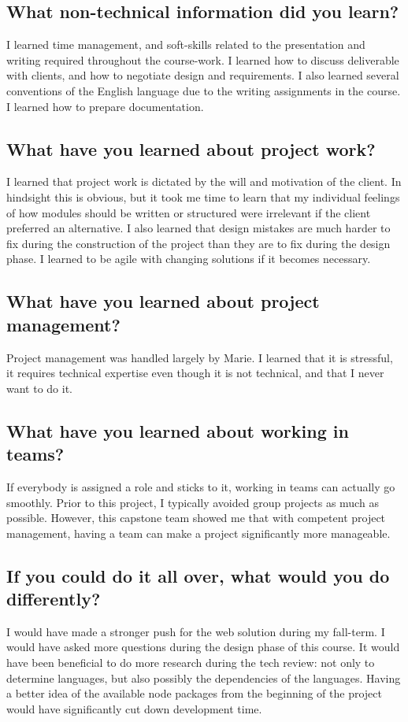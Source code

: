 \documentclass[onecolumn, draftclsnofoot,10pt, compsoc]{report}
\begin{document}
\subsection{What non-technical information did you learn?}
I learned time management, and soft-skills related to the presentation and writing required throughout the course-work. I learned how to discuss deliverable with clients, and how to negotiate design and requirements. I also learned several conventions of the English language due to the writing assignments in the course. I learned how to prepare documentation.
\subsection{What have you learned about project work?}
I learned that project work is dictated by the will and motivation of the client. In hindsight this is obvious, but it took me time to learn that my individual feelings of how modules should be written or structured were irrelevant if the client preferred an alternative. I also learned that design mistakes are much harder to fix during the construction of the project than they are to fix during the design phase. I learned to be agile with changing solutions if it becomes necessary.
\subsection{What have you learned about project management?}
Project management was handled largely by Marie. I learned that it is stressful, it requires technical expertise even though it is not technical, and that I never want to do it.
\subsection{What have you learned about working in teams?}
If everybody is assigned a role and sticks to it, working in teams can actually go smoothly. Prior to this project, I typically avoided group projects as much as possible. However, this capstone team showed me that with competent project management, having a team can make a project significantly more manageable.
\subsection{If you could do it all over, what would you do differently?}
I would have made a stronger push for the web solution during my fall-term. I would have asked more questions during the design phase of this course. It would have been beneficial to  do more research during the tech review: not only  to determine languages, but also possibly the dependencies of the languages. Having a better idea of the available node packages from the beginning of the project would have significantly cut down development time.
\end{document}

